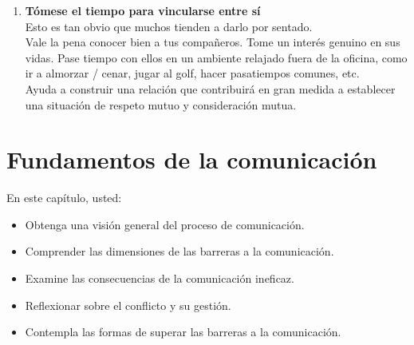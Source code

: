 \documentclass[10pt]{book}
\begin{document}
\begin{enumerate}[\bfseries 1.]
\begin{itemize}
\end{itemize}
\item \textbf{Tómese el tiempo para vincularse entre sí}\\
Esto es tan obvio que muchos tienden a darlo por sentado.\\
Vale la pena conocer bien a tus compañeros. Tome un interés genuino en sus vidas. Pase tiempo con ellos en un ambiente relajado fuera de la oficina, como ir a almorzar / cenar, jugar al golf, hacer pasatiempos comunes, etc.\\
Ayuda a construir una relación que contribuirá en gran medida a establecer una situación de respeto mutuo y consideración mutua.
\end{enumerate}
\chapter{Fundamentos de la comunicación}
En este capítulo, usted:
\begin{itemize}
\item Obtenga una visión general  del proceso de comunicación.
\item Comprender  las dimensiones de las barreras a la comunicación.
\item Examine  las consecuencias de la comunicación ineficaz.
\item Reflexionar  sobre el conflicto y su gestión.
\item Contempla las formas de superar las barreras a la comunicación.
\end{itemize}
\end{document}
